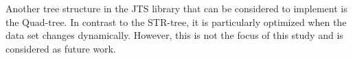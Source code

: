 \documentclass[a4paper,12pt]{article}
\begin{document}
Another tree structure in the JTS library 
that can be considered to implement is the Quad-tree.  
In contrast to the STR-tree, it is particularly optimized when the data set changes dynamically.
However, this is not the focus of this study and is considered as future work.
\newpage
\end{document}
